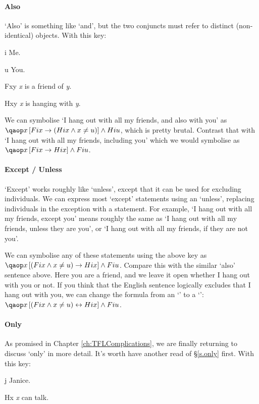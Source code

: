 \documentclass[PHIL101-Textbook.tex]{subfiles}
\begin{document}
\paragraph{Also}
`Also' is something like `and', but the two conjuncts must refer to distinct (non-identical) objects. With this key:
\begin{ekey}
\item[i] Me.
\item[u] You.
\item[Fxy] \textit{x} is a friend of  \textit{y}.
\item[Hxy] \textit{x} is hanging with \textit{y}.
\end{ekey}
We can symbolise `I hang out with all my friends, and also with you' as $\qab{x}{Fix \eif (Hix \eand x \neq u)} \eand Hiu$, which is pretty brutal. Contrast that with  `I hang out with all my friends, including you' which we would symbolise as $\qab{x}{Fix \eif Hix} \eand Fiu$.


\paragraph{Except / Unless}
`Except' works roughly like `unless', except that it can be used for excluding individuals. We can express most `except' statements using an `unless', replacing individuals in the exception with a statement. For example, `I hang out with all my friends, except you' means roughly the same as `I hang out with all my friends, unless they are you', or `I hang out with all my friends, if they are not you'.

We can symbolise any of these statements using the above key as $\qab{x}{(Fix\eand x \neq u) \eif Hix} \eand Fiu$. Compare this with the similar `also' sentence above. Here you are a friend, and we leave it open whether I hang out with you or not. If you think that the English sentence logically excludes that I hang out with you, we can change the formula from an `\eif' to a `\eiff': $\qab{x}{(Fix\eand x \neq u) \eiff Hix} \eand Fiu$.




\paragraph{Only}

As promised in Chapter \ref{ch:TFLComplications}, we are finally returning to discuss `only' in more detail. It's worth have another read of \S\ref{s.only} first. With this key:
\begin{ekey}
\item[j] Janice.
\item[Hx] \textit{x} can talk.
\end{ekey}
\end{document}
